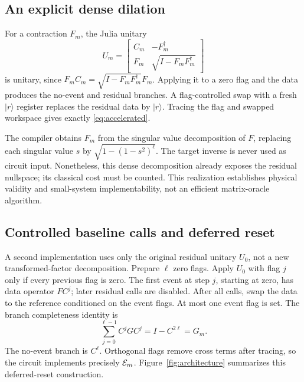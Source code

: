 \documentclass{ieeeaccess}
\newcommand{\ket}[1]{\lvert #1\rangle}\newcommand{\bra}[1]{\langle #1\rvert}
\begin{document}
\subsection{An explicit dense dilation}
For a contraction $F_m$, the Julia unitary
\begin{equation}\label{eq:julia}
U_m=\begin{bmatrix}C_m&-F_m^\dagger\\F_m&\sqrt{I-F_mF_m^\dagger}\end{bmatrix}
\end{equation}
is unitary, since $F_m C_m=\sqrt{I-F_mF_m^\dagger}F_m$. Applying it to a zero flag and the data produces the no-event and residual branches. A flag-controlled swap with a fresh $\ket r$ register replaces the residual data by $\ket r$. Tracing the flag and swapped workspace gives exactly \eqref{eq:accelerated}.

The compiler obtains $F_m$ from the singular value decomposition of $F$, replacing each singular value $s$ by $\sqrt{1-(1-s^2)^\ell}$. The target inverse is never used as circuit input. Nonetheless, this dense decomposition already exposes the residual nullspace; its classical cost must be counted. This realization establishes physical validity and small-system implementability, not an efficient matrix-oracle algorithm.

\subsection{Controlled baseline calls and deferred reset}
A second implementation uses only the original residual unitary $U_0$, not a new transformed-factor decomposition. Prepare $\ell$ zero flags. Apply $U_0$ with flag $j$ only if every previous flag is zero. The first event at step $j$, starting at zero, has data operator $FC^j$; later residual calls are disabled. After all calls, swap the data to the reference conditioned on the event flags. At most one event flag is set. The branch completeness identity is
\begin{equation}\label{eq:telescope}
\sum_{j=0}^{\ell-1}C^jGC^j=I-C^{2\ell}=G_m.
\end{equation}
The no-event branch is $C^\ell$. Orthogonal flags remove cross terms after tracing, so the circuit implements precisely $\mathcal E_m$. Figure~\ref{fig:architecture} summarizes this deferred-reset construction.
\end{document}
